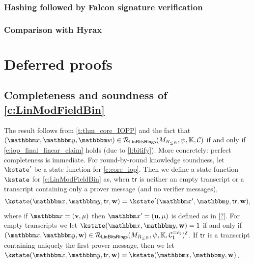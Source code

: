\documentclass[11pt,letterpaper,usenames,dvipsnames]{article}
\begin{document}
\subsubsection{Hashing followed by Falcon signature verification}



\subsubsection{Comparison with Hyrax}


\printbibliography[heading=bibintoc,title={References}]

\appendix


\section{Deferred proofs}


\subsection{Completeness and soundness of \cref{c:LinModFieldBin}}\label{a:LinModFieldBin}


The result follows  from \cref{t:thm_core_IOPP} and the fact that $(\inp,\oracle, \wit) \in \LinModFieldBin(M_{R_{\leq B}},\psi,\KK, \cC)$ if and only if \eqref{e:iop_final_linear_claim} holds (due to \cref{l:bitify}). More concretely: perfect completeness is immediate. For round-by-round knowledge soundness, let $\kstate'$ be a state function for \cref{c:core_iop}. Then   we define a state function $\kstate$ for \cref{c:LinModFieldBin} as, when $\mathsf{tr}$ is neither an empty transcript or a transcript containing only a prover message (and no verifier messages),
%
$$
\kstate(\inp, \oracle, \tr, \ww) = \kstate'(\inp', \oracle, \tr,\ww),
$$
where if $\inp=(\vv,\mu)$ then $\inp'=(\uu,\mu)$ is defined as in \cref{?}. For  empty transcripts we let $\kstate(\inp,\oracle,\ww)=1$ if and only if $(\inp,\oracle,\ww)\in \LinModFieldBin(M_{R_{\leq B}},\modulemorphism, \KK, \cC_1^{\equiv \codedim_2})^\delta$. If $\mathsf{tr}$ is a transcript containing uniquely the first prover message, then we let $\kstate(\inp, \oracle, \tr, \ww) = \kstate(\inp, \oracle, \ww)$. 
\end{document}
